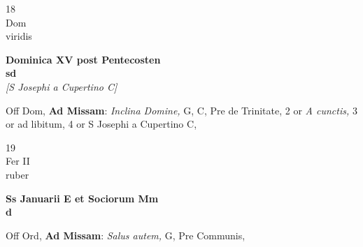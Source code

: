 \documentclass[10pt, openany]{book}
\begin{document}
        \begin{center}
            \begin{minipage}{3.5in}
                \vspace{2em}
                \begin{minipage}{0.5in}
                    {\Huge 18} \\
                    {\normalsize Dom} \\
                    {\normalsize viridis}
                \end{minipage}
                \begin{minipage}{3.0in}
                    \textbf{ \large Dominica XV post Pentecosten \\
                    \textnormal{\normalsize sd}} \\ \textit{[S Josephi a Cupertino C]} \\ 
                \end{minipage}
                \begin{justify}Off Dom, \textbf{Ad Missam}: \textit{Inclina Domine,} G, C, Pre de Trinitate, 2 or \textit{A cunctis,} 3 or ad libitum, 4 or S Josephi a Cupertino C,   
                \end{justify}
            \end{minipage}
        \end{center}
    
        \begin{center}
            \begin{minipage}{3.5in}
                \vspace{2em}
                \begin{minipage}{0.5in}
                    {\Huge 19} \\
                    {\normalsize Fer II} \\
                    {\normalsize ruber}
                \end{minipage}
                \begin{minipage}{3.0in}
                    \textbf{ \large Ss Januarii E et Sociorum Mm \\
                    \textnormal{\normalsize d}} \\ 
                \end{minipage}
                \begin{justify}Off Ord, \textbf{Ad Missam}: \textit{Salus autem,} G, Pre Communis,   
                \end{justify}
            \end{minipage}
        \end{center}
    
\end{document}
